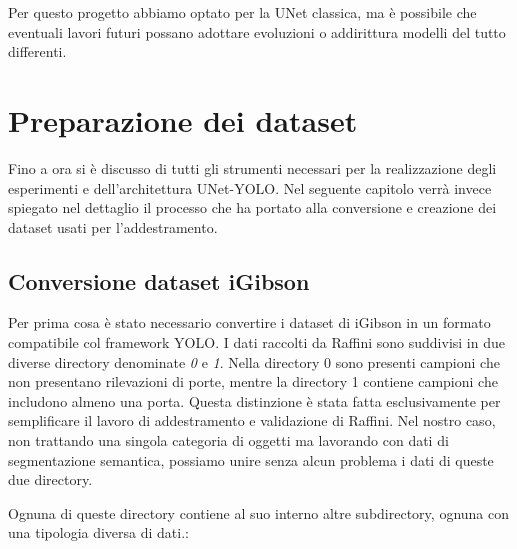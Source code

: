 \documentclass[12pt]{report}
\begin{document}
Per questo progetto abbiamo optato per la UNet classica, ma è possibile che eventuali lavori futuri possano adottare evoluzioni o addirittura modelli del tutto differenti.

\section{Preparazione dei dataset}
\label{sec:preparazione_dei_dataset}

Fino a ora si è discusso di tutti gli strumenti necessari per la realizzazione degli esperimenti e dell'architettura UNet-YOLO. Nel seguente capitolo verrà invece spiegato nel dettaglio il processo che ha portato alla conversione e creazione dei dataset usati per l'addestramento.

\subsection{Conversione dataset iGibson}
\label{sec:conversione_dataset_igibson}

Per prima cosa è stato necessario convertire i dataset di iGibson in un formato compatibile col framework YOLO. I dati raccolti da Raffini sono suddivisi in due diverse directory denominate \textit{0} e \textit{1}. Nella directory 0 sono presenti campioni che non presentano rilevazioni di porte, mentre la directory 1 contiene campioni che includono almeno una porta. Questa distinzione è stata fatta esclusivamente per semplificare il lavoro di addestramento e validazione di Raffini. Nel nostro caso, non trattando una singola categoria di oggetti ma lavorando con dati di segmentazione semantica, possiamo unire senza alcun problema i dati di queste due directory. 

Ognuna di queste directory contiene al suo interno altre subdirectory, ognuna con una tipologia diversa di dati.:
\end{document}
